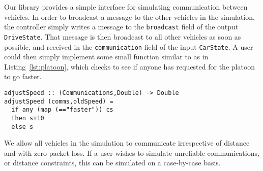Our library provides a simple interface for simulating communication between vehicles.
In order to broadcast a message to the other vehicles in the simulation, the controller simply writes a message to the \texttt{broadcast} field of the output \texttt{DriveState}.
That message is then broadcast to all other vehicles as soon as possible, and received in the \texttt{communication} field of the input \texttt{CarState}.
A user could then simply implement some small function similar to as in Listing~\ref{lst:platoon}, which checks to see if anyone has requested for the platoon to go faster.

\begin{lstlisting}[float,floatplacement=T,caption=Communicating between controllers, label=lst:platoon]
adjustSpeed :: (Communications,Double) -> Double
adjustSpeed (comms,oldSpeed) =
  if any (map (=="faster")) cs
  then s+10
  else s
\end{lstlisting}

We allow all vehicles in the simulation to communicate irrespective of distance and with zero packet loss.
If a user wishes to simulate unreliable communications, or distance constraints, this can be simulated on a case-by-case basis.
